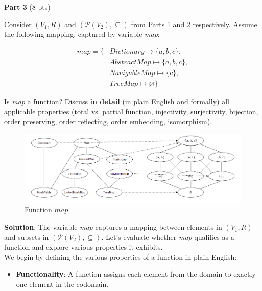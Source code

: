\documentclass[12pt]{article}
\begin{document}
\begin{spacing}{1.5}
\begin{enumerate}
	\end{enumerate}
			    
	\noindent \textbf{Part 3} (8 pts)
			
	\noindent Consider $(V_1, R)$ and $(\mathcal{P}(V_2), \subseteq)$ from Parts 1 and 2 respectively. Assume the following mapping, captured by variable \textit{map}:
			
	\begin{align*}
		map = \{ & Dictionary \mapsto \{a,b,c\},  \\
		         & AbstractMap \mapsto \{a,b,c\}, \\
		         & NavigableMap \mapsto \{c\},    \\
		         & TreeMap \mapsto \varnothing\}  
	\end{align*}
			
	\noindent Is \textit{map} a function? Discuss \textbf{in detail} (in plain English \uline{and} formally) all applicable properties (total vs. partial function, injectivity, surjectivity, bijection, order preserving, order reflecting, order embedding, isomorphism).\\
		
	\begin{figure}[htp]
		\centering
		\includegraphics[width=1.1\textwidth]{FunctionMapping_6_3.png}
		\caption{Function $map$}
		\label{fig:figure}
	\end{figure}
		
	\noindent \textbf{Solution}: The variable \textit{map} captures a mapping between elements in $(V_1, R)$ and subsets in $(\mathcal{P}(V_2), \subseteq)$. Let's evaluate whether \textit{map} qualifies as a function and explore various properties it exhibits.\\
		
	\noindent We begin by defining the various properties of a function in plain English:
		
	\begin{itemize}
		\item \textbf{Functionality}: A function assigns each element from the domain to exactly one element in the codomain.
		      		              

\end{itemize}
\end{spacing}
\end{document}
